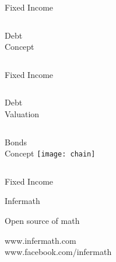 \documentclass[20pt,xcolor={dvipsnames}]{beamer}
\begin{document}
\begin{frame}

\vspace{-1cm}
\hspace{-0.5cm}
\Huge Fixed Income

\vspace{1cm}

\begin{columns}

Debt  \\ Concept


\end{columns}

\end{frame}

\begin{frame}

\vspace{-1cm}
\hspace{-0.5cm}
\Huge Fixed Income

\vspace{1cm}

\begin{columns}

Debt  \\ Valuation


\end{columns}

\end{frame}

\begin{frame}

\centering
\huge

\begin{columns}
Bonds  \\ Concept
\texttt{[image: chain]} 
\end{columns}

\vspace{0.25cm}

Fixed Income

\end{frame}

\begin{frame}[c]

\centering


\vspace{-1cm}

\Huge Infermath 

\normalsize Open source of math 

\vspace{1cm}

\large www.infermath.com \\
www.facebook.com/infermath 

\end{frame}
\end{document}
